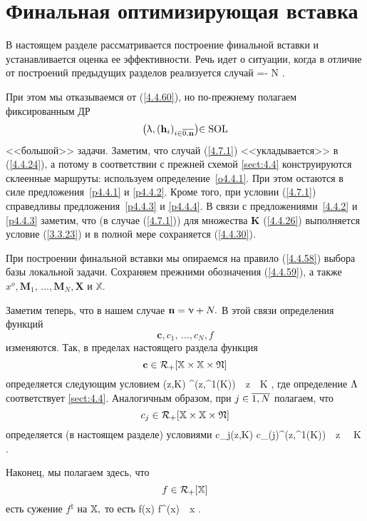 
\section{
  Финальная оптимизирующая вставка
}
\label{sect:4.7}
\setcounter{equation}{0}

В настоящем разделе рассматривается построение финальной вставки
и устанавливается оценка ее эффективности.
Речь идет о ситуации, когда в отличие от построений предыдущих
разделов реализуется случай
\bfn
  \label{4.7.1}
  \nu =\nn - N
  .
\efn

При этом мы отказываемся от (\ref{4.4.60}),
но по-прежнему полагаем фиксированным ДР
$$
  \bigl(\la,(\mathbf{h}_i)_{i\in\ov{0,\nn}}\bigl)\in \mathrm{SOL}
$$
<<большой>> задачи.
Заметим, что случай (\ref{4.7.1})
<<укладывается>> в (\ref{4.4.24}),
а потому в соответствии с прежней схемой \ref{sect:4.4}
конструируются склеенные маршруты:
используем определение~\ref{o4.4.1}.
При этом остаются в силе предложения~\ref{p4.4.1} и \ref{p4.4.2}.
Кроме того, при условии (\ref{4.7.1})
справедливы предложения~\ref{p4.4.3} и \ref{p4.4.4}.
В связи с предложениями~\ref{4.4.2} и \ref{p4.4.3}
заметим, что
(в случае (\ref{4.7.1}))
для множества $\mathbf{K}$ (\ref{4.4.26})
выполняется условие (\ref{3.3.23})
и в полной мере сохраняется (\ref{4.4.30}).

При построении финальной вставки мы опираемся на правило (\ref{4.4.58})
выбора базы локальной задачи.
Сохраняем прежними обозначения (\ref{4.4.59}),
а также
$x^o,\mathbf{M}_1,\,\ldots,\mathbf{M}_N,\mathbf{X}$ и
$\mathbb{X}.$

Заметим теперь, что в нашем случае
${\mathbf n}=\upnu+N.$
В этой связи определения функций
$$
  \mathbf{c},c_1,\,\ldots,c_N,f
$$
изменяются.
Так, в пределах настоящего раздела функция
$$
  \mathbf{c}\in {\cal R}_+[{\mathbb X} \times {\mathbb X}\times \mathfrak{N}]
$$
определяется следующим условием
\bfn
  \label{4.7.2}
  (z,K) \df {}^\natural\bigl(z,\La^1(K)\bigl)\ \
  \fa z\in \bbx\times \bbx\ \ \fa K\in {}
  ,
\efn
где определение $\Lambda$ соответствует \ref{sect:4.4}.
Аналогичным образом, при $j\in\ov{1,N}$
полагаем, что
$$
  c_j \in {\cal R}_+[{\mathbb X}\times {\mathbb X}\times \mathfrak{N}]
$$
определяется
(в настоящем разделе)
условиями
\bfn
  \label{4.7.3}
  c_j(z,K) \df c_{\La(j)}^\natural\bigl(z,\La^1(K)\bigl)\ \ \fa z\in
  \bbx\times \bbx\ \ \fa K\in \mathfrak{N}
  .
\efn

Наконец, мы полагаем здесь, что
$$
  f\in {\cal R}_+[{\mathbb X}]
$$
есть сужение $f^\natural$ на ${\mathbb X},$
то есть
\bfn
  \label{4.7.4}
  f(x) \df f^\natural(x)\ \ \fa x\in \bbx
  .
\efn

